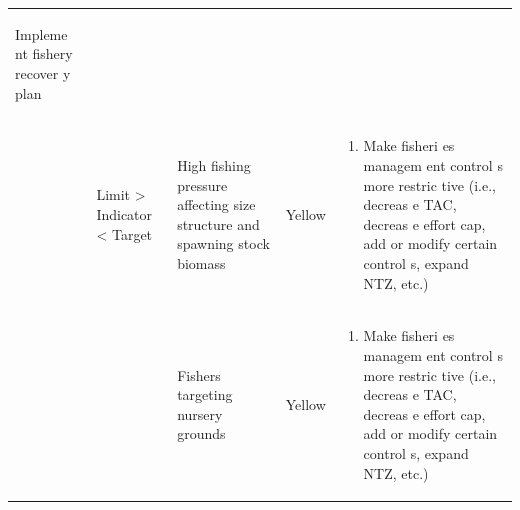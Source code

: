 \documentclass[]{book}
\providecommand{\tightlist}{%
  \setlength{\itemsep}{0pt}\setlength{\parskip}{0pt}}
\begin{document}
\begin{longtable}[]{@{}lllll@{}}
\begin{minipage}[t]{0.19\columnwidth}
\begin{enumerate}
  Impleme nt fishery recover y plan
\end{enumerate}\strut
\end{minipage}\tabularnewline
\begin{minipage}[t]{0.19\columnwidth}\raggedright\strut
\strut
\end{minipage} & \begin{minipage}[t]{0.19\columnwidth}\raggedright\strut
Limit \textgreater{} Indicator \textless{} Target\strut
\end{minipage} & \begin{minipage}[t]{0.19\columnwidth}\raggedright\strut
High fishing pressure affecting size structure and spawning stock
biomass\strut
\end{minipage} & \begin{minipage}[t]{0.19\columnwidth}\raggedright\strut
Yellow\strut
\end{minipage} & \begin{minipage}[t]{0.19\columnwidth}\raggedright\strut
\begin{enumerate}
\def\labelenumi{\arabic{enumi}.}
\tightlist
\item
  Make fisheri es managem ent control s more restric tive (i.e., decreas
  e TAC, decreas e effort cap, add or modify certain control s, expand
  NTZ, etc.)
\end{enumerate}\strut
\end{minipage}\tabularnewline
\begin{minipage}[t]{0.19\columnwidth}\raggedright\strut
\strut
\end{minipage} & \begin{minipage}[t]{0.19\columnwidth}\raggedright\strut
\strut
\end{minipage} & \begin{minipage}[t]{0.19\columnwidth}\raggedright\strut
Fishers targeting nursery grounds\strut
\end{minipage} & \begin{minipage}[t]{0.19\columnwidth}\raggedright\strut
Yellow\strut
\end{minipage} & \begin{minipage}[t]{0.19\columnwidth}\raggedright\strut
\begin{enumerate}
\def\labelenumi{\arabic{enumi}.}
\tightlist
\item
  Make fisheri es managem ent control s more restric tive (i.e., decreas
  e TAC, decreas e effort cap, add or modify certain control s, expand
  NTZ, etc.)
\end{enumerate}\strut

\end{minipage}
\end{longtable}
\end{document}
